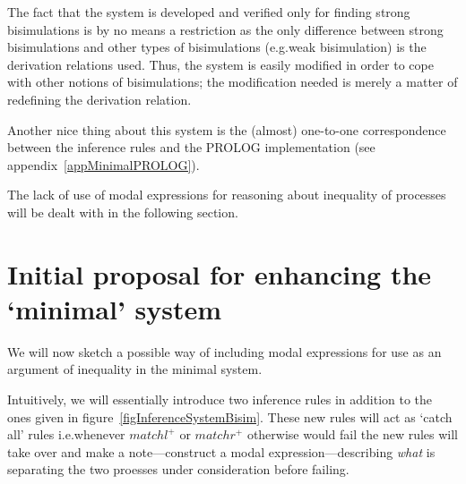 The fact that the system is developed and verified only for finding strong bisimulations is by no means a restriction as the only difference between strong bisimulations and other types of bisimulations (e.g.\@ weak bisimulation) is the derivation relations used. Thus, the system is easily modified in order to cope with other notions of bisimulations; the modification needed is merely a matter of redefining the derivation relation.

Another nice thing about this system is the (almost) one-to-one correspondence between the inference rules and the PROLOG implementation (see appendix~\ref{appMinimalPROLOG}).

The lack of use of modal expressions for reasoning about inequality of processes will be dealt with in the following section.


\section{Initial proposal for enhancing the `minimal' system}\label{secProposalEnhance}

We will now sketch a possible way of including modal expressions for use as an argument of inequality in the minimal system.

Intuitively, we will essentially introduce two inference rules in addition to the ones given in figure~\ref{figInferenceSystemBisim}. These new rules will act as `catch all' rules i.e.\@ whenever $matchl^{+}$ or $matchr^{+}$ otherwise would fail the new rules will take over and make a note---construct a modal expression---describing {\em what\/} is separating the two proesses under consideration before failing.

